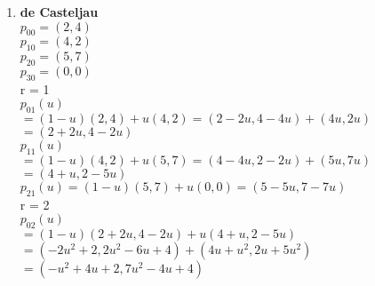 \documentclass[12pt]{article}
\begin{document}
\begin{enumerate}

\pagebreak

\item
\textbf{de Casteljau} \\
$p_{00} = (2,4)$ \\
$p_{10} = (4,2)$ \\
$p_{20} = (5,7)$ \\
$p_{30} = (0,0)$ \\

r = 1 \\
$p_{01}(u)$ \\ 
$= (1-u)(2,4)+u(4,2) = (2-2u,4-4u) + (4u,2u)$ \\ 
$= (2+2u,4-2u)$ \\

$p_{11}(u)$ \\ 
$= (1-u)(4,2)+u(5,7) = (4-4u,2-2u) + (5u,7u)$ \\ 
$= (4+u,2-5u)$ \\

$p_{21}(u) = (1-u)(5,7)+u(0,0) = (5-5u,7-7u)$ \\

r = 2 \\
$p_{02}(u) $ \\
$= (1-u)(2+2u,4-2u)+u(4+u,2-5u)$ \\
$= (-2u^2+2,2u^2-6u+4) + (4u+u^2,2u+5u^2)$ \\
$= (-u^2+4u+2,7u^2-4u+4)$ \\


\end{enumerate}
\end{document}
